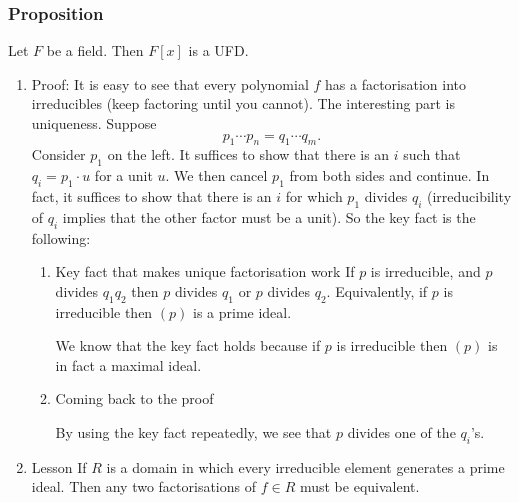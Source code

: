 \documentclass[11pt]{article}
\begin{document}
\subsubsection{Proposition}
\label{sec:org694eb6b}
Let \(F\) be a field.  Then \(F[x]\) is a UFD.
\begin{enumerate}
\item Proof:
\label{sec:org5962185}
It is easy to see that every polynomial \(f\) has a factorisation into irreducibles (keep factoring until you cannot).  The interesting part is uniqueness.
Suppose
\[ p_1 \cdots p_{n} = q_{1} \cdots q_{m}.\]
Consider \(p_{1}\) on the left.
It suffices to show that there is an \(i\) such that \(q_{i} = p_{1} \cdot u\) for a unit \(u\).
We then cancel \(p_1\) from both sides and continue.
In fact, it suffices to show that there is an \(i\) for which \(p_{1}\) divides \(q_i\) (irreducibility of \(q_i\) implies that the other factor must be a unit).
So the key fact is the following:
\begin{enumerate}
\item Key fact that makes unique factorisation work
\label{sec:orgdd12073}
If \(p\) is irreducible, and \(p\) divides \(q_1q_2\) then \(p\) divides \(q_1\) or \(p\) divides \(q_2\).
Equivalently, if \(p\) is irreducible then \((p)\) is a prime ideal.

We know that the key fact holds because if \(p\) is irreducible then \((p)\) is in fact a maximal ideal.
\item Coming back to the proof
\label{sec:orgb5745d8}

By using the key fact repeatedly, we see that \(p\) divides one of the \(q_{i}\)'s.
\end{enumerate}
\item Lesson
\label{sec:org6dac0a2}
If \(R\) is a domain in which every irreducible element generates a prime ideal.
Then any two factorisations of \(f \in R\) must be equivalent.
\end{enumerate}
\end{document}
